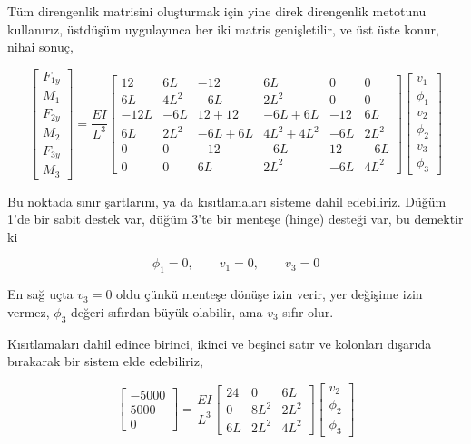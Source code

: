 \documentclass[12pt,fleqn]{article}\usepackage{../../common}
\begin{document}
Tüm direngenlik matrisini oluşturmak için yine direk direngenlik metotunu
kullanırız, üstdüşüm uygulayınca her iki matris genişletilir, ve üst üste konur,
nihai sonuç,

$$
\left[\begin{array}{c}
F_{1y} \\ M_1 \\ F_{2y} \\ M_2 \\ F_{3y} \\ M_3
\end{array}\right] =
\frac{EI}{L^3}
\left[\begin{array}{cccccc}
12 & 6L & -12 & 6L & 0 & 0 \\
6L & 4L^2 & -6L & 2L^2 & 0 & 0 \\
-12L & -6L & 12+12 & -6L+6L & -12 & 6L \\
6L & 2L^2 & -6L+6L & 4L^2+4L^2 & -6L & 2L^2 \\
0 & 0 & -12 & -6L & 12 & -6L \\
0 & 0 & 6L & 2L^2 & -6L & 4L^2
\end{array}\right]
\left[\begin{array}{c}
v_1 \\ \phi_1 \\ v_2 \\ \phi_2 \\ v_3 \\ \phi_3
\end{array}\right]
$$

Bu noktada sınır şartlarını, ya da kısıtlamaları sisteme dahil edebiliriz.
Düğüm 1'de bir sabit destek var, düğüm 3'te bir menteşe (hinge) desteği var,
bu demektir ki

$$
\phi_1 = 0, \qquad
v_1 = 0, \qquad
v_3 = 0
$$

En sağ uçta $v_3 = 0$ oldu çünkü menteşe dönüşe izin verir, yer değişime
izin vermez, $\phi_3$ değeri sıfırdan büyük olabilir, ama $v_3$ sıfır olur.

Kısıtlamaları dahil edince birinci, ikinci ve beşinci satır ve kolonları
dışarıda bırakarak bir sistem elde edebiliriz,

$$
\left[\begin{array}{c}
-5000 \\ 5000 \\ 0
\end{array}\right] =
\frac{EI}{L^3}
\left[\begin{array}{ccc}
24 & 0 & 6L \\
0 & 8L^2 & 2L^2 \\
6L & 2L^2 & 4L^2
\end{array}\right]
\left[\begin{array}{c}
v_2 \\ \phi_2 \\ \phi_3
\end{array}\right]
$$
\end{document}
